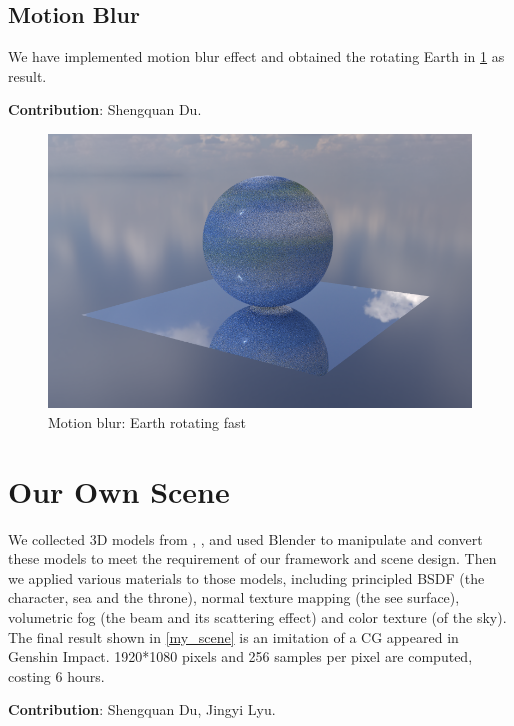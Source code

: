 \documentclass[acmtog]{acmart}
\begin{document}
\subsection{Motion Blur}

We have implemented motion blur effect and obtained the rotating Earth in \ref{motion_blur} as result.

\noindent \textbf{Contribution}: Shengquan Du.

\begin{figure}[h]
	\centering	
	\includegraphics[width=\linewidth]{motion_blur}
	\caption{Motion blur: Earth rotating fast}
	\label{motion_blur}
\end{figure}

\section{Our Own Scene}

We collected 3D models from \cite{scene1}, \cite{scene2}, \cite{furina} and used Blender to manipulate and convert these models to meet the requirement of our framework and scene design. Then we applied various materials to those models, including principled BSDF (the character, sea and the throne), normal texture mapping (the see surface), volumetric fog (the beam and its scattering effect) and color texture (of the sky). The final result shown in \ref{my_scene} is an imitation of a CG appeared in Genshin Impact. 1920*1080 pixels and 256 samples per pixel are computed, costing 6 hours.

\noindent \textbf{Contribution}: Shengquan Du, Jingyi Lyu.
\end{document}
